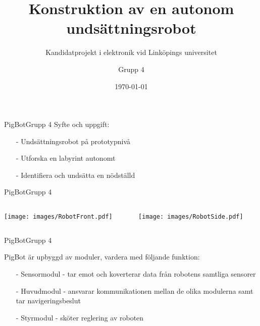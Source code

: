 \usepackage{extras}

\title{Konstruktion av en autonom undsättningsrobot}
\subtitle{Kandidatprojekt i elektronik vid Linköpings universitet}
\author{Grupp 4}
\beamertemplatenavigationsymbolsempty
\date{\today}



\begin{frame}
  \titlepage
\end{frame}

\begin{frame}[fragile]{PigBot}{Grupp 4}
Syfte och uppgift:
  \begin{itemize}
    \item[-] Undsättningsrobot på prototypnivå
    \item[-] Utforska en labyrint autonomt
    \item[-] Identifiera och undsätta en nödställd
  \end{itemize}
\end{frame}

\begin{frame}{PigBot}{Grupp 4}
  \begin{columns}
    \begin{column}{0.5\textwidth}
      \texttt{[image: images/RobotFront.pdf]}
    \end{column}
    \begin{column}{0.5\textwidth}
      \texttt{[image: images/RobotSide.pdf]}
    \end{column}
  \end{columns}
\end{frame}

\begin{frame}[fragile]{PigBot}{Grupp 4}

PigBot är upbyggd av moduler, vardera med följande funktion:
  \begin{itemize}
    \item[-] Sensormodul - tar emot och koverterar data från robotens samtliga sensorer
    \item[-] Huvudmodul - ansvarar kommunikationen mellan de olika modulerna samt tar navigeringsbeslut
    \item[-] Styrmodul - sköter reglering av roboten
  \end{itemize}
\end{frame}

